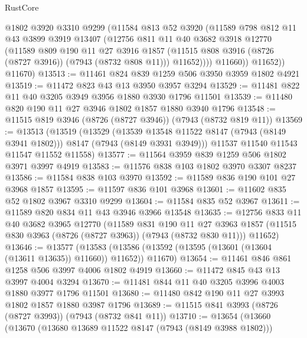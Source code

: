 \begin{lexlean}{RustCore}
\begin{coremodule}
              @1802
              @3920
              @3310
              @9299
              (@11584
                @813
                @52
                @3920
                (@11589
                  @798
                  @812
                  @11
                  @43
                  @3899
                  @3919
                  @13407
                  (@12756
                    @811
                    @11
                    @40
                    @3682
                    @3918
                    @12770
                    (@11589
                      @809
                      @190
                      @11
                      @27
                      @3916
                      @1857
                      (@11515 @808 @3916 (@8726 (@8727 @3916)) (@7943 (@8732 @808 @11)))
                      @11652))))
              @11660))
          @11652))
      @11670)
@13513 := @11461 @824 @839 @1259 @506 @3950 @3959 @1802 @4921
@13519 := @11472 @823 @43 @13 @3950 @3957 @3294
@13529 := @11481 @822 @11 @40 @3205 @3949 @3956 @1880 @3930 @1796 @11501
@13539 := @11480 @820 @190 @11 @27 @3946 @1802 @1857 @1880 @3940 @1796
@13548 := @11515 @819 @3946 (@8726 (@8727 @3946)) (@7943 (@8732 @819 @11))
@13569 := @13513
    (@13519
      (@13529
        (@13539 @13548 @11522 @8147 (@7943 (@8149 @3941 @1802)))
        @8147
        (@7943 (@8149 @3931 @3949)))
      @11537
      @11540
      @11543
      @11547
      @11552
      @11558)
@13577 := @11564 @3959 @839 @1259 @506 @1802 @3971 @3997 @4919
@13583 := @11576 @838 @103 @1802 @3970 @3307 @8237
@13586 := @11584 @838 @103 @3970
@13592 := @11589 @836 @190 @101 @27 @3968 @1857
@13595 := @11597 @836 @101 @3968
@13601 := @11602 @835 @52 @1802 @3967 @3310 @9299
@13604 := @11584 @835 @52 @3967
@13611 := @11589 @820 @834 @11 @43 @3946 @3966 @13548
@13635 := @12756
    @833
    @11
    @40
    @3682
    @3965
    @12770
    (@11589
      @831
      @190
      @11
      @27
      @3963
      @1857
      (@11515 @830 @3963 (@8726 (@8727 @3963)) (@7943 (@8732 @830 @11)))
      @11652)
@13646 := @13577
    (@13583 (@13586 (@13592 (@13595 (@13601 (@13604 (@13611 @13635)) @11660)) @11652)) @11670)
@13654 := @11461 @846 @861 @1258 @506 @3997 @4006 @1802 @4919
@13660 := @11472 @845 @43 @13 @3997 @4004 @3294
@13670 := @11481 @844 @11 @40 @3205 @3996 @4003 @1880 @3977 @1796 @11501
@13680 := @11480 @842 @190 @11 @27 @3993 @1802 @1857 @1880 @3987 @1796
@13689 := @11515 @841 @3993 (@8726 (@8727 @3993)) (@7943 (@8732 @841 @11))
@13710 := @13654
    (@13660
      (@13670
        (@13680 @13689 @11522 @8147 (@7943 (@8149 @3988 @1802)))

\end{coremodule}
\end{lexlean}
